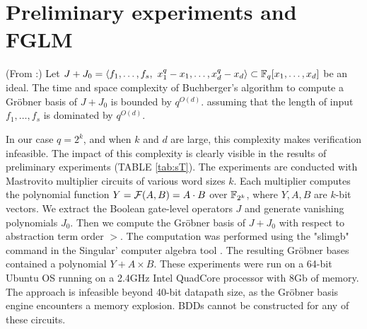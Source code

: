 \section{Preliminary experiments and FGLM}
\label{sec:fglm}


\begin{Theorem}
(From \cite{lv:date2012}:) Let $J + J_0 = \langle f_1, \dots, f_s, ~x_1^q -
  x_1, \dots, x_d^q - x_d\rangle \subset {\mathbb{F}}_{q} [x_1, \dots, x_d]$ be an
  ideal. The time and space complexity of Buchberger's algorithm to
  compute a Gr\"obner basis of $J + J_0$ is bounded by $q^{O(d)}$.
 assuming that the length of input $f_1, \dots, f_s$ is dominated by
 $q^{O(d)}$.  
\end{Theorem}

In our case $q = 2^k$, and when $k$ and $d$ are large, this complexity 
makes verification infeasible. The impact of this complexity is clearly
visible in the results of preliminary experiments (TABLE \ref{tab:sT}).
The experiments are conducted with Mastrovito \cite{mastro:1989}
multiplier circuits of various word sizes $k$. Each multiplier
computes the polynomial function  $Y = {\mathcal{F}}(A,B) = A \cdot B$ over
${\mathbb{F}}_{2^k}$, where $Y, A, B$ are $k$-bit vectors. We extract the 
Boolean gate-level operators $J$ and generate vanishing polynomials $J_0$.
Then we compute the Gr\"obner basis of $J + J_0$
with respect to abstraction term order $>$. The computation was performed
using the "slimgb" command in the {\sc Singular'} computer algebra
tool \cite{DGPS}. The resulting Gr\"obner bases contained a polynomial
$Y + A \times B$.  
These experiments were run on a 64-bit Ubuntu OS running on a 2.4GHz 
Intel QuadCore processor with 8Gb of memory. The approach is
infeasible beyond 40-bit datapath size, as the Gr\"obner basis engine
encounters a memory explosion. BDDs cannot be constructed for
any of these circuits. 


